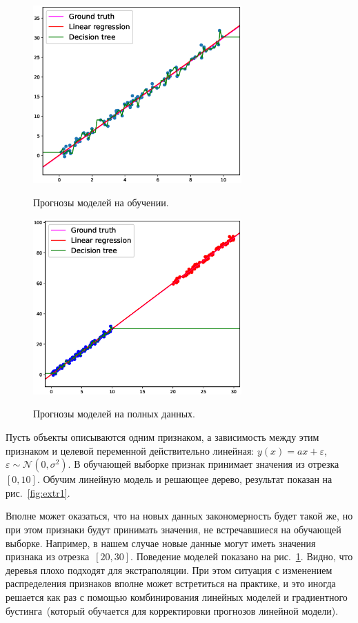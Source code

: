 \documentclass[12pt,fleqn]{article}
\begin{document}
\begin{figure}[t]
  \begin{multicols}{2}
    \hfill
    \includegraphics[width=80mm]{img/extrapolation-1.eps}
    \hfill
    \caption{Прогнозы моделей на обучении.}
    \label{fig:extr1}
    \hfill
    \includegraphics[width=80mm]{img/extrapolation-2.eps}
    \hfill
    \caption{Прогнозы моделей на полных данных.}
    \label{fig:extr2}
  \end{multicols}
\end{figure}

Пусть объекты описываются одним признаком, а зависимость между этим признаком
и целевой переменной действительно линейная:
$y(x) = a x + \varepsilon$, $\varepsilon \sim \mathcal{N}(0, \sigma^2)$.
В обучающей выборке признак принимает значения из отрезка~$[0, 10]$.
Обучим линейную модель и решающее дерево, результат показан на рис.~\ref{fig:extr1}.

Вполне может оказаться, что на новых данных закономерность будет такой же, но при этом
признаки будут принимать значения, не встречавшиеся на обучающей выборке.
Например, в нашем случае новые данные могут иметь значения признака из отрезка~$[20, 30]$.
Поведение моделей показано на рис.~\ref{fig:extr2}.
Видно, что деревья плохо подходят для экстраполяции.
При этом ситуация с изменением распределения признаков вполне может встретиться на практике,
и это иногда решается как раз с помощью комбинирования линейных моделей и градиентного бустинга~(который
обучается для корректировки прогнозов линейной модели).
\end{document}
